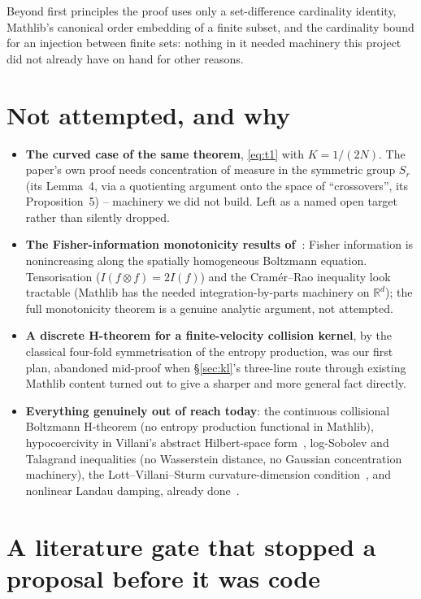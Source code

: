 \documentclass[11pt,a4paper]{article}
\begin{document}
Beyond first principles the proof uses only a set-difference cardinality identity, Mathlib's canonical
order embedding of a finite subset, and the cardinality bound for an injection between finite sets:
nothing in it needed machinery this project did not already have on hand for other reasons.

\section{Not attempted, and why}
\label{sec:notdone}

\begin{itemize}[leftmargin=*,itemsep=2pt]
\item \textbf{The curved case of the same theorem}, \eqref{eq:t1} with $K=1/(2N)$. The paper's own proof
needs concentration of measure in the symmetric group $S_r$ (its Lemma~4, via a quotienting argument
onto the space of ``crossovers'', its Proposition~5) -- machinery we did not build. Left as a named open
target rather than silently dropped.
\item \textbf{The Fisher-information monotonicity results of~\cite{Villani2025,ISV2024}}: Fisher
information is nonincreasing along the spatially homogeneous Boltzmann equation. Tensorisation
($I(f\otimes f)=2I(f)$) and the Cram\'er--Rao inequality look tractable (Mathlib has the needed
integration-by-parts machinery on $\mathbb R^d$); the full monotonicity theorem is a genuine analytic
argument, not attempted.
\item \textbf{A discrete H-theorem for a finite-velocity collision kernel}, by the classical four-fold
symmetrisation of the entropy production, was our first plan, abandoned mid-proof when \S\ref{sec:kl}'s
three-line route through existing Mathlib content turned out to give a sharper and more general fact
directly.
\item \textbf{Everything genuinely out of reach today}: the continuous collisional Boltzmann H-theorem
(no entropy production functional in Mathlib), hypocoercivity in Villani's abstract Hilbert-space
form~\cite{Villani2009}, log-Sobolev and Talagrand inequalities (no Wasserstein distance, no Gaussian
concentration machinery), the Lott--Villani--Sturm curvature-dimension
condition~\cite{LottVillani2009,LottVillani2007}, and nonlinear Landau damping, already
done~\cite{Bedrossian2026}.
\end{itemize}

\section{A literature gate that stopped a proposal before it was code}
\label{sec:gate}
\end{document}
